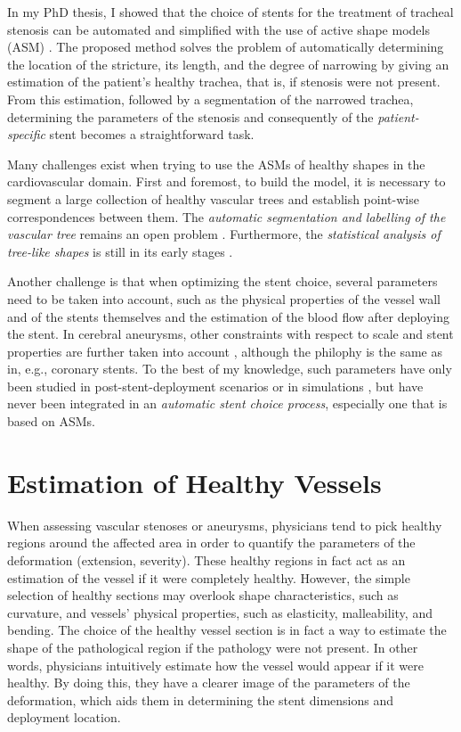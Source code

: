 In my PhD thesis, I showed that the choice of stents for the treatment of tracheal stenosis can be automated and simplified with the use of active shape models (ASM) \citep{Cootes}. The proposed method solves the problem of automatically determining the location of the stricture, its length, and the degree of narrowing by giving an estimation of the patient's healthy trachea, that is, if stenosis were not present. From this estimation, followed by a segmentation of the narrowed trachea, determining the parameters of the stenosis and consequently of the {\em patient-specific} stent becomes a straightforward task. 

Many challenges exist when trying to use the ASMs of healthy shapes in the cardiovascular domain. First and foremost, to build the model, it is necessary to segment a large collection of healthy vascular trees and establish point-wise correspondences between them. The {\em automatic segmentation and labelling of the vascular tree} remains an open problem \citep{ORKI-08,Antiga,CARR-07,Scherl200721,Bemmel,Dikkers}. Furthermore, the {\em statistical analysis of tree-like shapes} is still in its early stages \citep{Feragen2011,Feragen2012}. 

Another challenge is that when optimizing the stent choice, several parameters need to be taken into account, such as the physical properties of the vessel wall and of the stents themselves and the estimation of the blood flow after deploying the stent. In cerebral aneurysms, other constraints with respect to scale and stent properties are further taken into account \citep{larrabide:2439,Larrabide2010,bogunovic:210,zhang:1294}, although the philophy is the same as in, e.g., coronary stents. To the best of my knowledge, such parameters have only been studied in post-stent-deployment scenarios or in simulations \citep{deBeule,Florez2,Gori,Vuk,FLOR-07b,Sforza}, but have never been integrated in an {\em automatic stent choice process}, especially one that is based on ASMs. 

\section{Estimation of Healthy Vessels}
\label{sec:healthyvessels}

\challenge
When assessing vascular stenoses or aneurysms, physicians tend to pick healthy regions around the affected area in order to quantify the parameters of the deformation (extension, severity). These healthy regions in fact act as an estimation of the vessel if it were completely healthy. However, the simple selection of healthy sections may overlook shape characteristics, such as curvature, and vessels' physical properties, such as elasticity, malleability, and bending. The choice of the healthy vessel section is in fact a way to estimate the shape of the pathological region if the pathology were not present. In other words, physicians intuitively estimate how the vessel would appear if it were healthy. By doing this, they have a clearer image of the parameters of the deformation, which aids them in determining the stent dimensions and deployment location.

